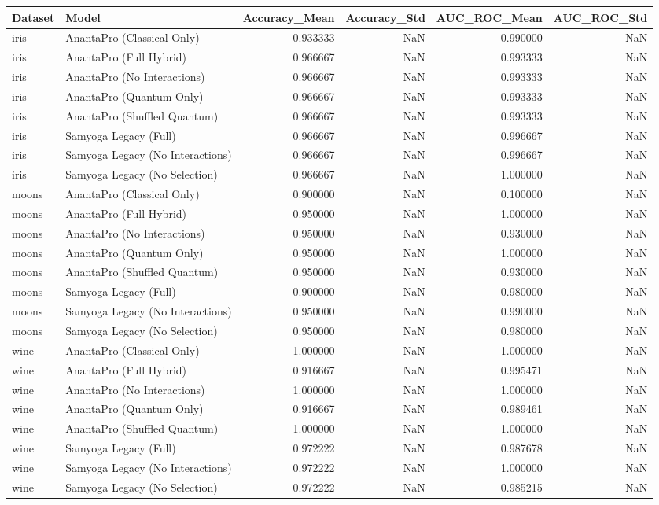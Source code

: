 \begin{tabular}{llrrrr}
\toprule
Dataset & Model & Accuracy_Mean & Accuracy_Std & AUC_ROC_Mean & AUC_ROC_Std \\
\midrule
iris & AnantaPro (Classical Only) & 0.933333 & NaN & 0.990000 & NaN \\
iris & AnantaPro (Full Hybrid) & 0.966667 & NaN & 0.993333 & NaN \\
iris & AnantaPro (No Interactions) & 0.966667 & NaN & 0.993333 & NaN \\
iris & AnantaPro (Quantum Only) & 0.966667 & NaN & 0.993333 & NaN \\
iris & AnantaPro (Shuffled Quantum) & 0.966667 & NaN & 0.993333 & NaN \\
iris & Samyoga Legacy (Full) & 0.966667 & NaN & 0.996667 & NaN \\
iris & Samyoga Legacy (No Interactions) & 0.966667 & NaN & 0.996667 & NaN \\
iris & Samyoga Legacy (No Selection) & 0.966667 & NaN & 1.000000 & NaN \\
moons & AnantaPro (Classical Only) & 0.900000 & NaN & 0.100000 & NaN \\
moons & AnantaPro (Full Hybrid) & 0.950000 & NaN & 1.000000 & NaN \\
moons & AnantaPro (No Interactions) & 0.950000 & NaN & 0.930000 & NaN \\
moons & AnantaPro (Quantum Only) & 0.950000 & NaN & 1.000000 & NaN \\
moons & AnantaPro (Shuffled Quantum) & 0.950000 & NaN & 0.930000 & NaN \\
moons & Samyoga Legacy (Full) & 0.900000 & NaN & 0.980000 & NaN \\
moons & Samyoga Legacy (No Interactions) & 0.950000 & NaN & 0.990000 & NaN \\
moons & Samyoga Legacy (No Selection) & 0.950000 & NaN & 0.980000 & NaN \\
wine & AnantaPro (Classical Only) & 1.000000 & NaN & 1.000000 & NaN \\
wine & AnantaPro (Full Hybrid) & 0.916667 & NaN & 0.995471 & NaN \\
wine & AnantaPro (No Interactions) & 1.000000 & NaN & 1.000000 & NaN \\
wine & AnantaPro (Quantum Only) & 0.916667 & NaN & 0.989461 & NaN \\
wine & AnantaPro (Shuffled Quantum) & 1.000000 & NaN & 1.000000 & NaN \\
wine & Samyoga Legacy (Full) & 0.972222 & NaN & 0.987678 & NaN \\
wine & Samyoga Legacy (No Interactions) & 0.972222 & NaN & 1.000000 & NaN \\
wine & Samyoga Legacy (No Selection) & 0.972222 & NaN & 0.985215 & NaN \\
\bottomrule
\end{tabular}
